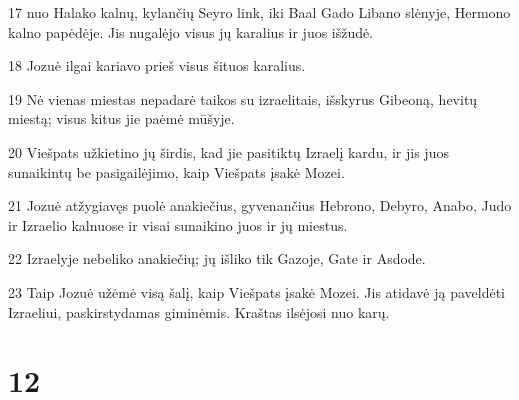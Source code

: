 \par 17 nuo Halako kalnų, kylančių Seyro link, iki Baal Gado Libano slėnyje, Hermono kalno papėdėje. Jis nugalėjo visus jų karalius ir juos išžudė. 
\par 18 Jozuė ilgai kariavo prieš visus šituos karalius. 
\par 19 Nė vienas miestas nepadarė taikos su izraelitais, išskyrus Gibeoną, hevitų miestą; visus kitus jie paėmė mūšyje. 
\par 20 Viešpats užkietino jų širdis, kad jie pasitiktų Izraelį kardu, ir jis juos sunaikintų be pasigailėjimo, kaip Viešpats įsakė Mozei. 
\par 21 Jozuė atžygiavęs puolė anakiečius, gyvenančius Hebrono, Debyro, Anabo, Judo ir Izraelio kalnuose ir visai sunaikino juos ir jų miestus. 
\par 22 Izraelyje nebeliko anakiečių; jų išliko tik Gazoje, Gate ir Asdode. 
\par 23 Taip Jozuė užėmė visą šalį, kaip Viešpats įsakė Mozei. Jis atidavė ją paveldėti Izraeliui, paskirstydamas giminėmis. Kraštas ilsėjosi nuo karų.



\chapter{12}


